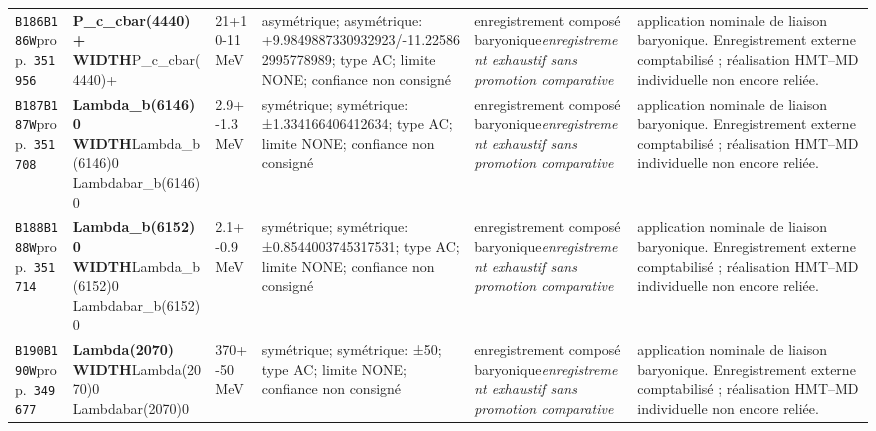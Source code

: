 \begin{landscape}
\begin{longtable}{L{1.85cm}L{4.45cm}L{2.35cm}L{4.05cm}L{3.35cm}L{7.15cm}}
\texttt{B186}\newline \texttt{B186W}\newline prop.\ \texttt{351956} & \textbf{P\_\allowbreak{}c\_\allowbreak{}cbar(4440)+ WIDTH}\newline P\_\allowbreak{}c\_\allowbreak{}cbar(4440)+ & 21+10-11\,MeV & asymétrique; asymétrique: +9.9849887330932923/-11.225862995778989; type AC; limite NONE; confiance non consigné & enregistrement composé baryonique\newline \emph{enregistrement exhaustif sans promotion comparative} & application nominale de liaison baryonique. Enregistrement externe comptabilisé ; réalisation HMT--MD individuelle non encore reliée. \\
\texttt{B187}\newline \texttt{B187W}\newline prop.\ \texttt{351708} & \textbf{Lambda\_\allowbreak{}b(6146)0 WIDTH}\newline Lambda\_\allowbreak{}b(6146)0 \textbar{}\allowbreak{} Lambdabar\_\allowbreak{}b(6146)0 & 2.9+-1.3\,MeV & symétrique; symétrique: ±1.334166406412634; type AC; limite NONE; confiance non consigné & enregistrement composé baryonique\newline \emph{enregistrement exhaustif sans promotion comparative} & application nominale de liaison baryonique. Enregistrement externe comptabilisé ; réalisation HMT--MD individuelle non encore reliée. \\
\texttt{B188}\newline \texttt{B188W}\newline prop.\ \texttt{351714} & \textbf{Lambda\_\allowbreak{}b(6152)0 WIDTH}\newline Lambda\_\allowbreak{}b(6152)0 \textbar{}\allowbreak{} Lambdabar\_\allowbreak{}b(6152)0 & 2.1+-0.9\,MeV & symétrique; symétrique: ±0.8544003745317531; type AC; limite NONE; confiance non consigné & enregistrement composé baryonique\newline \emph{enregistrement exhaustif sans promotion comparative} & application nominale de liaison baryonique. Enregistrement externe comptabilisé ; réalisation HMT--MD individuelle non encore reliée. \\
\texttt{B190}\newline \texttt{B190W}\newline prop.\ \texttt{349677} & \textbf{Lambda(2070) WIDTH}\newline Lambda(2070)0 \textbar{}\allowbreak{} Lambdabar(2070)0 & 370+-50\,MeV & symétrique; symétrique: ±50; type AC; limite NONE; confiance non consigné & enregistrement composé baryonique\newline \emph{enregistrement exhaustif sans promotion comparative} & application nominale de liaison baryonique. Enregistrement externe comptabilisé ; réalisation HMT--MD individuelle non encore reliée. \\

\end{longtable}
\end{landscape}
